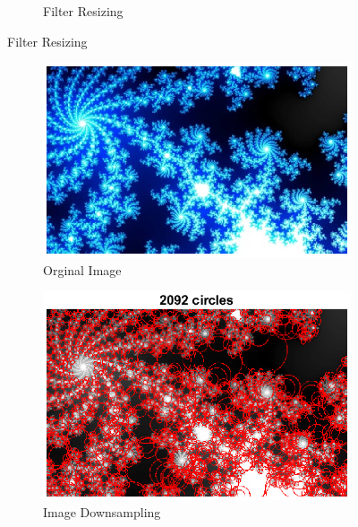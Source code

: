 \documentclass{article}
\newcommand{\tl}[1]{\textlatin{#1}}
\begin{document}
\begin{figure}[H]
\begin{subfigure}[b]{0.37\textwidth}
			\caption{\tl{Filter Resizing}}	
		\end{subfigure}%
	\end{figure}

	\begin{figure}[H]
		\begin{subfigure}[b]{0.37\textwidth}
			\includegraphics[width=\textwidth]{res/snowflakes.eps}
			\caption{\tl{Orginal Image}}
		\end{subfigure}%
		\begin{subfigure}[b]{0.37\textwidth}
			\includegraphics[width=\textwidth]{res/snowflakes_blob_method2.eps}	
			\caption{\tl{Image Downsampling}}	
		\end{subfigure}%
		\begin{subfigure}[b]{0.37\textwidth}

\end{subfigure}
\end{figure}
\end{document}
